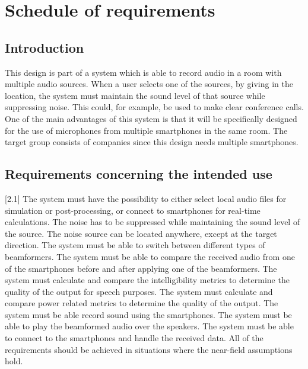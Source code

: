 \chapter{Schedule of requirements}
\label{schedule}

\section{Introduction}
This design is part of a system which is able to record audio in a room with multiple audio sources. When a user selects one of the sources, by giving in the location, the system must maintain the sound level of that source while suppressing noise. This could, for example, be used to make clear conference calls. One of the main advantages of this system is that it will be specifically designed for the use of microphones from multiple smartphones in the same room. The target group consists of companies since this design needs multiple smartphones.

\section{Requirements concerning the intended use}
[2.1] The system must have the possibility to either select local audio files for simulation or post-processing, or connect to smartphones for real-time calculations. \newline
[2.2] The noise has to be suppressed while maintaining the sound level of the source. \newline
[2.3] The noise source can be located anywhere, except at the target direction. \newline
[2.4] The system must be able to switch between different types of beamformers. \newline
[2.5] The system must be able to compare the received audio from one of the smartphones before and after applying one of the beamformers. \newline
[2.6] The system must calculate and compare the intelligibility metrics to determine the quality of the output for speech purposes. \newline
[2.7] The system must calculate and compare power related metrics to determine the quality of the output. \newline
[2.8] The system must be able record sound using the smartphones. \newline
[2.9] The system must be able to play the beamformed audio over the speakers. \newline
[2.10] The system must be able to connect to the smartphones and handle the received data. \newline
[2.11] All of the requirements should be achieved in situations where the near-field assumptions hold.

